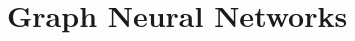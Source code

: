 \documentclass{article}
\newcommand\·{\ensuremath{\cdot}}
\newcommand\…{\ensuremath{\dots}}
\newcommand{\⇔}{\ensuremath{\iff}}
\newcommand{\⇐}{\ensuremath{\impliedby}}
\newcommand{\⇒}{\ensuremath{\implies}}
\newcommand\1{\ensuremath{\mathds{1}}}
\newcommand\ℝ{\ensuremath{\mathds{R}}}
\begin{document}
\subsection{}

\section{Graph Neural Networks}
\subsection{}
\subsubsection{}
\subsubsection{}
\subsection{}
\subsection{}
\subsubsection{}
\subsubsection{}
\end{document}

